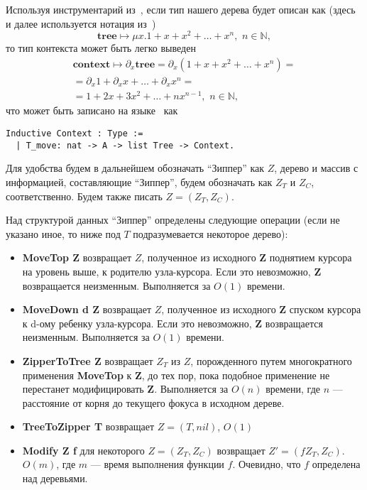 Используя инструментарий из~\autocite{McBride2009}, если тип нашего дерева будет описан как (здесь и далее используется нотация из~\autocite{McBride2009})
\begin{equation*}
\textbf{tree} \mapsto \mu x. 1 + x + x^2 + \dotsc + x^n, \,\, n \in \mathbb{N},
\end{equation*}   
то тип контекста может быть легко выведен
\begin{multline*}
\textbf{context} \mapsto \partial_x \textbf{tree} = \partial_x \left( 1 + x + x^2 + \dotsc + x^n \right)  = \\
= \partial_x 1 + \partial_x x + \dotsc + \partial_x x^n = \\
= 1 + 2x + 3x^2 + \dotsc + nx^{n-1}, \,\, n \in \mathbb{N},
\end{multline*}
что может быть записано на языке \tcoq~как
\begin{Verbatim}[fontsize=\small]
Inductive Context : Type :=
  | T_move: nat -> A -> list Tree -> Context.
\end{Verbatim}

Для удобства будем в дальнейшем обозначать ``Зиппер'' как $Z$, дерево и массив с информацией, составляющие ``Зиппер'', будем обозначать как $Z_T$ и $Z_C$, соответственно. Будем также писать $Z = (Z_T, Z_C)$.

Над структурой данных ``Зиппер'' определены следующие операции (если не указано иное, то ниже под $T$ подразумевается некоторое дерево):
\begin{itemize}
\item \textbf{MoveTop Z} возвращает $Z$, полученное из исходного \textbf{Z} поднятием курсора на уровень выше, к родителю узла-курсора. Если это невозможно, \textbf{Z} возвращается неизменным. Выполняется за $O(1)$ времени.
\item \textbf{MoveDown d Z} возвращает $Z$, полученное из исходного \textbf{Z} спуском курсора к d-ому ребенку узла-курсора. Если это невозможно, \textbf{Z} возвращается неизменным. Выполняется за $O(1)$ времени.
\item \textbf{ZipperToTree Z} возвращает $Z_T$ из $Z$, порожденного путем многократного применения \textbf{MoveTop} к \textbf{Z}, до тех пор, пока подобное применение не перестанет модифицировать \textbf{Z}. Выполняется за $O(n)$ времени, где $n$ --- расстояние от корня до текущего фокуса в исходном дереве.
\item \textbf{TreeToZipper T} возвращает $Z = (T, nil)$, $O(1)$
\item \textbf{Modify Z f} для некоторого $Z = (Z_T, Z_C)$ возвращает $Z' = (f Z_T, Z_C)$. $O(m)$, где $m$ --- время выполнения функции $f$. Очевидно, что $f$ определена над деревьями.
\end{itemize}

